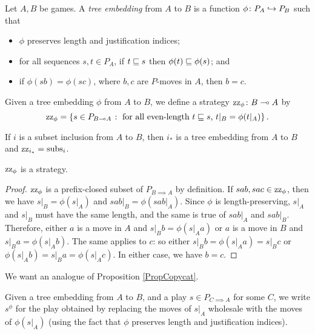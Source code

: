\documentclass[11pt]{report}
\begin{document}
\begin{definition}
  Let $A,B$ be games.  
  A \emph{tree embedding} from $A$ to $B$ is a function $\phi\colon P_A \hookrightarrow P_B$ such that
  \begin{itemize}
    \item $\phi$ preserves length and justification indices; 
    \item for all sequences $s,t\in P_A$, if $t\sqsubseteq s$ then $\phi(t)\sqsubseteq\phi(s)$; and
    \item if $\phi(sb)=\phi(sc)$, where $b,c$ are $P$-moves in $A$, then $b=c$.
  \end{itemize}

  Given a tree embedding $\phi$ from $A$ to $B$, we define a strategy $\operatorname{zz}_\phi\colon B \multimap A$ by
  \[
    \operatorname{zz}_\phi = \{s\in P_{B\multimap A}\;\colon\;\text{for all even-length $t\sqsubseteq s$, $t\vert_B=\phi(t\vert_A)$}\}\,.
    \]
\end{definition}
\begin{example}
  If $i$ is a subset inclusion from $A$ to $B$, then $i_*$ is a tree embedding from $A$ to $B$ and $\operatorname{zz}_{i_*}=\operatorname{subs}_i$.
\end{example}

\begin{proposition}
  $\operatorname{zz}_\phi$ is a strategy.  
\end{proposition}
\begin{proof}
  $\operatorname{zz}_\phi$ is a prefix-closed subset of $P_{B\implies A}$ by definition.  
  If $sab,sac\in\operatorname{zz}_\phi$, then we have $s\vert_B=\phi(s\vert_A)$ and $sab\vert_B=\phi(sab\vert_A)$.
  Since $\phi$ is length-preserving, $s\vert_A$ and $s\vert_B$ must have the same length, and the same is true of $sab\vert_A$ and $sab\vert_B$.  
  Therefore, either $a$ is a move in $A$ and $s\vert_Bb=\phi(s\vert_Aa)$ or $a$ is a move in $B$ and $s\vert_Ba=\phi(s\vert_Ab)$.  
  The same applies to $c$: so either $s\vert_Bb=\phi(s\vert_Aa)=s\vert_Bc$ or $\phi(s\vert_Ab)=s\vert_Ba=\phi(s\vert_Ac)$.  
  In either case, we have $b=c$.
\end{proof}

We want an analogue of Proposition \ref{PropCopycat}.

\begin{definition}
  Given a tree embedding from $A$ to $B$, and a play $s\in P_{C\implies A}$ for some $C$, we write $s^\phi$ for the play obtained by replacing the moves of $s\vert_A$ wholesale with the moves of $\phi(s\vert_A)$ (using the fact that $\phi$ preserves length and justification indices).
\end{definition}
\end{document}
